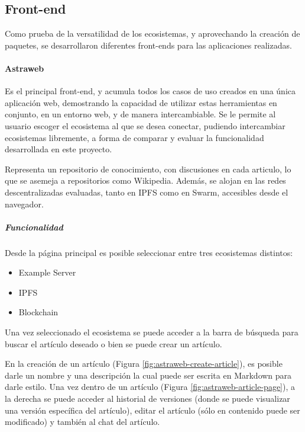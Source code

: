 \subsection{Front-end}


Como prueba de la versatilidad de los ecosistemas, y aprovechando la creación de paquetes, se desarrollaron diferentes front-ends para las aplicaciones realizadas.

\paragraph{Astraweb}

Es el principal front-end, y acumula todos los casos de uso creados en una única aplicación web, demostrando la capacidad de utilizar estas herramientas en conjunto, en un entorno web, y de manera intercambiable. Se le permite al usuario escoger el ecosistema al que se desea conectar, pudiendo intercambiar ecosistemas libremente, a forma de comparar y evaluar la funcionalidad desarrollada en este proyecto.

Representa un repositorio de conocimiento, con discusiones en cada articulo, lo que se asemeja a repositorios como Wikipedia. Además, se alojan en las redes descentralizadas evaluadas, tanto en IPFS como en Swarm, accesibles desde el navegador.

\subparagraph{Funcionalidad}

Desde la página principal es posible seleccionar entre tres ecosistemas distintos:

\begin{itemize}
    \item Example Server
    \item IPFS
    \item Blockchain
\end{itemize}

Una vez seleccionado el ecosistema se puede acceder a la barra de búsqueda para buscar el artículo deseado o bien se puede crear un artículo.

En la creación de un artículo (Figura \ref{fig:astraweb-create-article}), es posible darle un nombre y una descripción la cual puede ser escrita en Markdown para darle estilo. Una vez dentro de un artículo (Figura \ref{fig:astraweb-article-page}), a la derecha se puede acceder al historial de versiones (donde se puede visualizar una versión específica del artículo), editar el artículo (sólo en contenido puede ser modificado) y también al chat del artículo.

